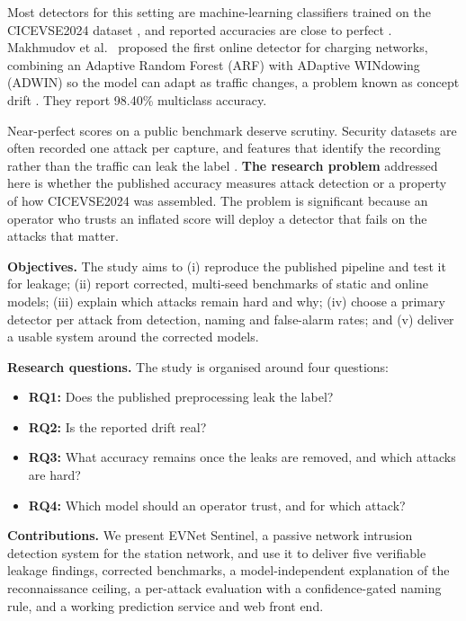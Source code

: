 \documentclass[conference]{IEEEtran}
\begin{document}
Most detectors for this setting are machine-learning classifiers trained on the CICEVSE2024 dataset \cite{b8}, and reported accuracies are close to perfect \cite{b1,b2}. Makhmudov et al.\ \cite{b4} proposed the first online detector for charging networks, combining an Adaptive Random Forest (ARF) \cite{b6} with ADaptive WINdowing (ADWIN) \cite{b7} so the model can adapt as traffic changes, a problem known as concept drift \cite{b15}. They report 98.40\% multiclass accuracy.

Near-perfect scores on a public benchmark deserve scrutiny. Security datasets are often recorded one attack per capture, and features that identify the recording rather than the traffic can leak the label \cite{b10,b11,b13}. \textbf{The research problem} addressed here is whether the published accuracy measures attack detection or a property of how CICEVSE2024 was assembled. The problem is significant because an operator who trusts an inflated score will deploy a detector that fails on the attacks that matter.

\textbf{Objectives.} The study aims to (i) reproduce the published pipeline and test it for leakage; (ii) report corrected, multi-seed benchmarks of static and online models; (iii) explain which attacks remain hard and why; (iv) choose a primary detector per attack from detection, naming and false-alarm rates; and (v) deliver a usable system around the corrected models.

\textbf{Research questions.} The study is organised around four questions:
\begin{itemize}
    \item \textbf{RQ1:} Does the published preprocessing leak the label?
    \item \textbf{RQ2:} Is the reported drift real?
    \item \textbf{RQ3:} What accuracy remains once the leaks are removed, and which attacks are hard?
    \item \textbf{RQ4:} Which model should an operator trust, and for which attack?
\end{itemize}

\textbf{Contributions.} We present EVNet Sentinel, a passive network intrusion detection system for the station network, and use it to deliver five verifiable leakage findings, corrected benchmarks, a model-independent explanation of the reconnaissance ceiling, a per-attack evaluation with a confidence-gated naming rule, and a working prediction service and web front end.
\end{document}
